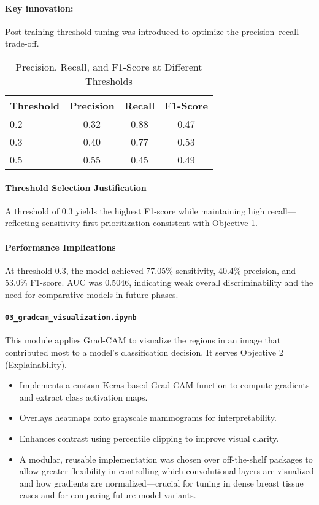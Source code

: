 \documentclass[12pt]{article}
\begin{document}
\paragraph{Key innovation:} Post-training threshold tuning was introduced to optimize the precision–recall trade-off.

\begin{table}[H]
\centering
\caption{Precision, Recall, and F1-Score at Different Thresholds}
\begin{tabular}{lccc}
\toprule
Threshold & Precision & Recall & F1-Score \\
\midrule
0.2 & 0.32 & 0.88 & 0.47 \\
0.3 & 0.40 & 0.77 & 0.53 \\
0.5 & 0.55 & 0.45 & 0.49 \\
\bottomrule
\end{tabular}
\end{table}

\paragraph{Threshold Selection Justification}
A threshold of 0.3 yields the highest F1-score while maintaining high recall—reflecting sensitivity-first prioritization consistent with Objective 1.

\paragraph{Performance Implications}
At threshold 0.3, the model achieved 77.05\% sensitivity, 40.4\% precision, and 53.0\% F1-score. AUC was 0.5046, indicating weak overall discriminability and the need for comparative models in future phases.

\paragraph{\texttt{03\_gradcam\_visualization.ipynb}}
This module applies Grad-CAM to visualize the regions in an image that contributed most to a model’s classification decision. It serves Objective 2 (Explainability).

\begin{itemize}
    \item Implements a custom Keras-based Grad-CAM function to compute gradients and extract class activation maps.
    \item Overlays heatmaps onto grayscale mammograms for interpretability.
    \item Enhances contrast using percentile clipping to improve visual clarity.
    \item A modular, reusable implementation was chosen over off-the-shelf packages to allow greater flexibility in controlling which convolutional layers are visualized and how gradients are normalized—crucial for tuning in dense breast tissue cases and for comparing future model variants.
\end{itemize}
\end{document}
